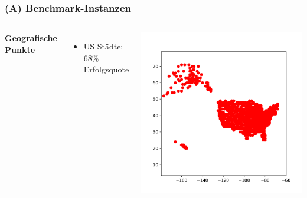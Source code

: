\documentclass[aspectratio=169]{beamer}
\begin{document}
\begin{frame}
	\frametitle{(A) Benchmark-Instanzen}
	\begin{columns}[c] %
	
	\textbf{Geografische Punkte}
	\begin{itemize}
		\item US Städte: 68\% Erfolgsquote
	\end{itemize}
	
	\includegraphics[scale=.5]{cities.pdf}
	

	\end{columns}
	\end{frame}

\end{document}
